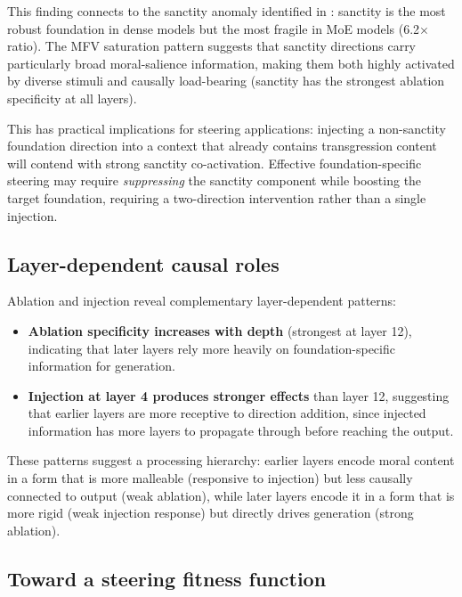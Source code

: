 This finding connects to the sanctity anomaly identified in \citet{reblitzrichardson2026geometry}: sanctity is the most robust foundation in dense models but the most fragile in MoE models (6.2\(\times\) ratio).
The MFV saturation pattern suggests that sanctity directions carry particularly broad moral-salience information, making them both highly activated by diverse stimuli and causally load-bearing (sanctity has the strongest ablation specificity at all layers).

This has practical implications for steering applications: injecting a non-sanctity foundation direction into a context that already contains transgression content will contend with strong sanctity co-activation.
Effective foundation-specific steering may require \emph{suppressing} the sanctity component while boosting the target foundation, requiring a two-direction intervention rather than a single injection.

\subsection{Layer-dependent causal roles}\label{layer-dependent-causal-roles}

Ablation and injection reveal complementary layer-dependent patterns:

\begin{itemize}
\tightlist
\item
  \textbf{Ablation specificity increases with depth} (strongest at layer 12), indicating that later layers rely more heavily on foundation-specific information for generation.
\item
  \textbf{Injection at layer 4 produces stronger effects} than layer 12, suggesting that earlier layers are more receptive to direction addition, since injected information has more layers to propagate through before reaching the output.
\end{itemize}

These patterns suggest a processing hierarchy: earlier layers encode moral content in a form that is more malleable (responsive to injection) but less causally connected to output (weak ablation), while later layers encode it in a form that is more rigid (weak injection response) but directly drives generation (strong ablation).

\subsection{Toward a steering fitness function}\label{toward-a-steering-fitness-function}

